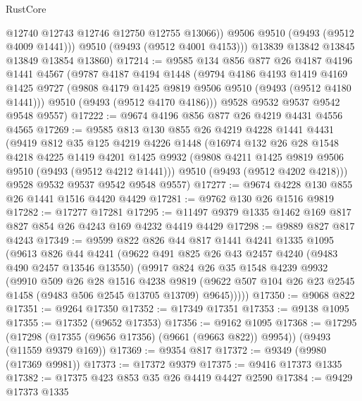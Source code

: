 \begin{lexlean}{RustCore}
\begin{coremodule}
              @12740
              @12743
              @12746
              @12750
              @12755
              @13066))
          @9506
          @9510
          (@9493 (@9512 @4009 @1441)))
        @9510
        (@9493 (@9512 @4001 @4153)))
      @13839
      @13842
      @13845
      @13849
      @13854
      @13860)
@17214 := @9585
    @134
    @856
    @877
    @26
    @4187
    @4196
    @1441
    @4567
    (@9787
      @4187
      @4194
      @1448
      (@9794
        @4186
        @4193
        @1419
        @4169
        @1425
        @9727
        (@9808 @4179 @1425 @9819 @9506 @9510 (@9493 (@9512 @4180 @1441)))
        @9510
        (@9493 (@9512 @4170 @4186)))
      @9528
      @9532
      @9537
      @9542
      @9548
      @9557)
@17222 := @9674 @4196 @856 @877 @26 @4219 @4431 @4556 @4565
@17269 := @9585
    @813
    @130
    @855
    @26
    @4219
    @4228
    @1441
    @4431
    (@9419
      @812
      @35
      @125
      @4219
      @4226
      @1448
      (@16974
        @132
        @26
        @28
        @1548
        @4218
        @4225
        @1419
        @4201
        @1425
        @9932
        (@9808 @4211 @1425 @9819 @9506 @9510 (@9493 (@9512 @4212 @1441)))
        @9510
        (@9493 (@9512 @4202 @4218)))
      @9528
      @9532
      @9537
      @9542
      @9548
      @9557)
@17277 := @9674 @4228 @130 @855 @26 @1441 @1516 @4420 @4429
@17281 := @9762 @130 @26 @1516 @9819
@17282 := @17277 @17281
@17295 := @11497 @9379 @1335 @1462 @169 @817 @827 @854 @26 @4243 @169 @4232 @4419 @4429
@17298 := @9889 @827 @817 @4243
@17349 := @9599
    @822
    @826
    @44
    @817
    @1441
    @4241
    @1335
    @1095
    (@9613
      @826
      @44
      @4241
      (@9622
        @491
        @825
        @26
        @43
        @2457
        @4240
        (@9483 @490 @2457 @13546 @13550)
        (@9917
          @824
          @26
          @35
          @1548
          @4239
          @9932
          (@9910
            @509
            @26
            @28
            @1516
            @4238
            @9819
            (@9622 @507 @104 @26 @23 @2545 @1458 (@9483 @506 @2545 @13705 @13709) @9645)))))
@17350 := @9068 @822
@17351 := @9264 @17350
@17352 := @17349 @17351
@17353 := @9138 @1095
@17355 := @17352 (@9652 @17353)
@17356 := @9162 @1095
@17368 := @17295
    (@17298 (@17355 (@9656 @17356) (@9661 (@9663 @822)) @9954))
    (@9493 (@11559 @9379 @169))
@17369 := @9354 @817
@17372 := @9349 (@9980 (@17369 @9981))
@17373 := @17372 @9379
@17375 := @9416 @17373 @1335
@17382 := @17375 @423 @853 @35 @26 @4419 @4427 @2590
@17384 := @9429 @17373 @1335

\end{coremodule}
\end{lexlean}

